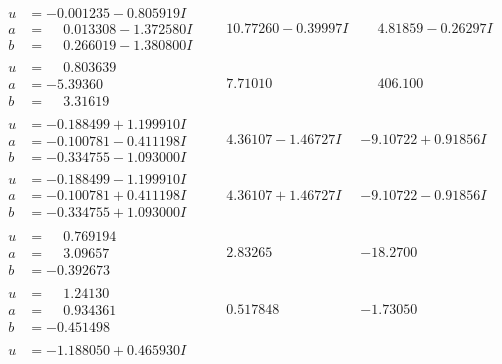 \documentclass[1p]{elsarticle_modified}
\theoremstyle{definition}
\begin{document}
$$\begin{array}{c|c|c}
\begin{aligned}
u &= -0.001235 - 0.805919 I \\
a &= \phantom{-}0.013308 - 1.372580 I \\
b &= \phantom{-}0.266019 - 1.380800 I\end{aligned}
 & \phantom{-}10.77260 - 0.39997 I & \phantom{-}4.81859 - 0.26297 I \\ \hline\begin{aligned}
u &= \phantom{-}0.803639\phantom{ +0.000000I} \\
a &= -5.39360\phantom{ +0.000000I} \\
b &= \phantom{-}3.31619\phantom{ +0.000000I}\end{aligned}
 & \phantom{-}7.71010\phantom{ +0.000000I} & \phantom{-}406.100\phantom{ +0.000000I} \\ \hline\begin{aligned}
u &= -0.188499 + 1.199910 I \\
a &= -0.100781 - 0.411198 I \\
b &= -0.334755 - 1.093000 I\end{aligned}
 & \phantom{-}4.36107 - 1.46727 I & -9.10722 + 0.91856 I \\ \hline\begin{aligned}
u &= -0.188499 - 1.199910 I \\
a &= -0.100781 + 0.411198 I \\
b &= -0.334755 + 1.093000 I\end{aligned}
 & \phantom{-}4.36107 + 1.46727 I & -9.10722 - 0.91856 I \\ \hline\begin{aligned}
u &= \phantom{-}0.769194\phantom{ +0.000000I} \\
a &= \phantom{-}3.09657\phantom{ +0.000000I} \\
b &= -0.392673\phantom{ +0.000000I}\end{aligned}
 & \phantom{-}2.83265\phantom{ +0.000000I} & -18.2700\phantom{ +0.000000I} \\ \hline\begin{aligned}
u &= \phantom{-}1.24130\phantom{ +0.000000I} \\
a &= \phantom{-}0.934361\phantom{ +0.000000I} \\
b &= -0.451498\phantom{ +0.000000I}\end{aligned}
 & \phantom{-}0.517848\phantom{ +0.000000I} & -1.73050\phantom{ +0.000000I} \\ \hline\begin{aligned}
u &= -1.188050 + 0.465930 I \\

\end{aligned}
\end{array}$$
\end{document}
